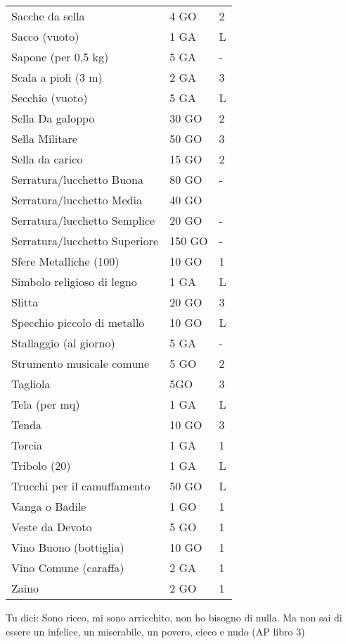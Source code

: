 \documentclass[12pt,a4paper,twoside,openany]{book}
\begin{document}
\begin{multicols}{2}
{\begin{tabularx}{0.42\textwidth}{lll}
Sacche da sella & 4 GO& 2\\
Sacco (vuoto) & 1 GA& L \\
Sapone (per 0,5 kg) & 5 GA& - \\
Scala a pioli (3 m) & 2 GA& 3 \\
Secchio (vuoto)& 5 GA& L\\
Sella Da galoppo  & 30 GO& 2\\
Sella Militare  & 50 GO  & 3\\
Sella da carico & 15 GO  & 2\\
Serratura/lucchetto Buona & 80 GO  & -\\
Serratura/lucchetto Media & 40 GO&  \\
Serratura/lucchetto Semplice& 20 GO  & -\\
Serratura/lucchetto Superiore& 150 GO  & - \\
Sfere Metalliche (100) & 10 GO & 1\\
Simbolo religioso di legno  & 1 GA& L\\
Slitta& 20 GO  & 3 \\
Specchio piccolo di metallo & 10 GO  & L\\
Stallaggio (al giorno)  & 5 GA& -\\
Strumento musicale comune& 5 GO& 2\\
Tagliola& 5GO&3\\
Tela (per mq)& 1 GA& L \\
Tenda & 10 GO  & 3 \\
Torcia& 1 GA& 1\\
Tribolo (20) & 1 GA& L \\
Trucchi per il camuffamento & 50 GO& L\\
Vanga o Badile & 1 GO&1\\
Veste da Devoto & 5 GO& 1\\
Vino Buono (bottiglia) & 10 GO& 1\\
Vino Comune (caraffa)  & 2 GA& 1\\
Zaino & 2 GO& 1 \\
\end{tabularx}}


\begin{changemargin}{0.3cm}{0.3cm}\begin{enfasi}{
Tu dici: Sono ricco, mi sono arricchito, non ho bisogno di nulla. Ma non sai di essere un infelice, un miserabile, un povero, cieco e nudo (AP libro 3)
}\end{enfasi}\end{changemargin}


\end{multicols}
\end{document}
